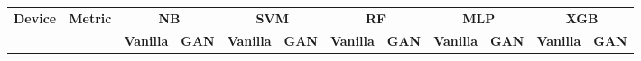 \begin{table*}[htp]
\centering
\begin{tabular}{@{}|c|c|c|c|c|c|c|c|c|c|c|c|@{}}
\toprule
\multirow{}{}{\textbf{Device}}                                    & \multirow{}{}{\textbf{Metric}}                                  & \multicolumn{2}{c|}{\textbf{NB}}                                                                                        & \multicolumn{2}{c|}{\textbf{SVM}}                                                                                       & \multicolumn{2}{c|}{\textbf{RF}}                                                                                        & \multicolumn{2}{c|}{\textbf{MLP}}                                                                                       & \multicolumn{2}{c|}{\textbf{XGB}}                                                                                       \\ \cmidrule(l){3-12} 
                                                                    &                                                                   & \textbf{Vanilla}                                           & \textbf{GAN}                                               & \textbf{Vanilla}                                           & \textbf{GAN}                                               & \textbf{Vanilla}                                           & \textbf{GAN}                                               & \textbf{Vanilla}                                           & \textbf{GAN}                                               & \textbf{Vanilla}                                           & \textbf{GAN}                                               \\ \midrule

\end{tabular}
\end{table*}
